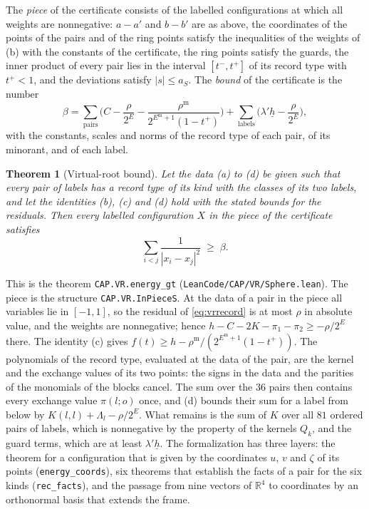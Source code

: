 \documentclass[reqno,a4paper,11pt]{amsart}
\numberwithin{equation}{section}
\newtheorem{theorem}{Theorem}[section]
\def\R{{\mathbb R}}
\newcommand{\lean}[1]{\texttt{#1}}
\newcommand{\file}[1]{\nolinkurl{#1}}
\begin{document}
The \emph{piece} of the certificate consists of the labelled configurations at which all weights are nonnegative: $a - a'$ and $b - b'$ are as above, the coordinates of the points of the pairs and of the ring points satisfy the inequalities of the weights of (b) with the constants of the certificate, the ring points satisfy the guards, the inner product of every pair lies in the interval $[t^-, t^+]$ of its record type with $t^+ < 1$, and the deviations satisfy $|s| \leq a_S$. The \emph{bound} of the certificate is the number
$$
\beta = \sum_{\text{pairs}} \Big( C - \frac{\rho}{2^E} - \frac{\rho^{\mathrm m}}{2^{E^{\mathrm m} + 1} (1 - t^+)} \Big) + \sum_{\text{labels}} \Big( \lambda' \underline h{} - \frac{\rho}{2^E} \Big),
$$
with the constants, scales and norms of the record type of each pair, of its minorant, and of each label.

\begin{theorem}[Virtual-root bound]\label{thm:vr}
Let the data \textup{(a)} to \textup{(d)} be given such that every pair of labels has a record type of its kind with the classes of its two labels, and let the identities \textup{(b)}, \textup{(c)} and \textup{(d)} hold with the stated bounds for the residuals. Then every labelled configuration $X$ in the piece of the certificate satisfies
$$
\sum_{i<j} \frac{1}{|x_i - x_j|^2} \;\geq\; \beta .
$$
\end{theorem}

This is the theorem \lean{CAP.VR.energy\_gt} (\file{LeanCode/CAP/VR/Sphere.lean}). The piece is the structure \lean{CAP.VR.InPieceS}. At the data of a pair in the piece all variables lie in $[-1, 1]$, so the residual of \eqref{eq:vrrecord} is at most $\rho$ in absolute value, and the weights are nonnegative; hence $h - C - 2K - \pi_1 - \pi_2 \geq -\rho / 2^E$ there. The identity (c) gives $f(t) \geq h - \rho^{\mathrm m} / (2^{E^{\mathrm m}+1} (1 - t^+))$. The polynomials of the record type, evaluated at the data of the pair, are the kernel and the exchange values of its two points: the signs in the data and the parities of the monomials of the blocks cancel. The sum over the $36$ pairs then contains every exchange value $\pi(l; o)$ once, and (d) bounds their sum for a label from below by $K(l, l) + \Lambda_l - \rho/2^E$. What remains is the sum of $K$ over all $81$ ordered pairs of labels, which is nonnegative by the property of the kernels $Q_k$, and the guard terms, which are at least $\lambda' \underline h$. The formalization has three layers: the theorem for a configuration that is given by the coordinates $u$, $v$ and $\zeta$ of its points (\lean{energy\_coords}), six theorems that establish the facts of a pair for the six kinds (\lean{rec\_facts}), and the passage from nine vectors of $\R^4$ to coordinates by an orthonormal basis that extends the frame.
\end{document}
